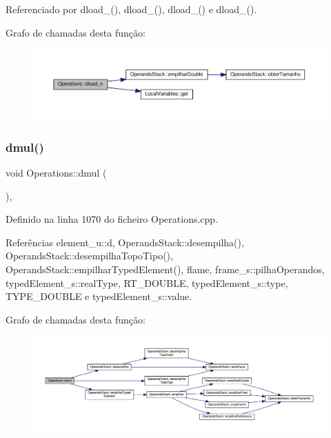 Referenciado por dload\+\_(), dload\+\_(), dload\+\_() e dload\+\_().

Grafo de chamadas desta função\+:
\nopagebreak
\begin{figure}[H]
\begin{center}
\leavevmode
\includegraphics[width=350pt]{classOperations_a44536bc4112eb4eebe23ff85e9b7d02b_cgraph}
\end{center}
\end{figure}
\mbox{\label{classOperations_afe1944066f35f66d588d1a28124ebb55}} 
\subsubsection{\texorpdfstring{dmul()}{dmul()}}
{\footnotesize\ttfamily void Operations\+::dmul (\begin{DoxyParamCaption}{ }\end{DoxyParamCaption})\hspace{0.3cm}{\ttfamily [static]}, {\ttfamily [private]}}



Definido na linha 1070 do ficheiro Operations.\+cpp.



Referências element\+\_\+u\+::d, Operands\+Stack\+::desempilha(), Operands\+Stack\+::desempilha\+Topo\+Tipo(), Operands\+Stack\+::empilhar\+Typed\+Element(), flame, frame\+\_\+s\+::pilha\+Operandos, typed\+Element\+\_\+s\+::real\+Type, R\+T\+\_\+\+D\+O\+U\+B\+LE, typed\+Element\+\_\+s\+::type, T\+Y\+P\+E\+\_\+\+D\+O\+U\+B\+LE e typed\+Element\+\_\+s\+::value.

Grafo de chamadas desta função\+:
\nopagebreak
\begin{figure}[H]
\begin{center}
\leavevmode
\includegraphics[width=350pt]{classOperations_afe1944066f35f66d588d1a28124ebb55_cgraph}
\end{center}
\end{figure}
\mbox{\label{classOperations_a04f5d4f85b80f4c04216cd0259d3d7dc}} 
